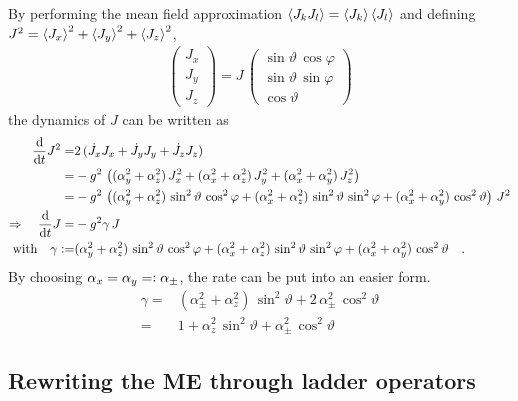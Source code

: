 \documentclass{article}
\begin{document}
By performing the mean field approximation $\braket{J_kJ_l}=\braket{J_k}\braket{J_l}$ and defining $J^2=\braket{J_x}^2+\braket{J_y}^2+\braket{J_z}^2$,
\begin{align*}
    \left(
    \begin{array}{c}
        J_x\\J_y\\J_z
    \end{array}
    \right)=J\,\left(\begin{array}{c}
        \sin\vartheta\,\cos\varphi \\
        \sin\vartheta\,\sin\varphi\\
        \cos\vartheta
    \end{array}
    \right)
\end{align*}
the dynamics of $J$ can be written as
\begin{align*}
    \dt J^2=&2\,(\dot{J}_xJ_x+\dot{J}_yJ_y+\dot{J}_zJ_z)\\=&-g^2\,\left((\alpha_y^2+\alpha_z^2)\,J_x^2+(\alpha_x^2+\alpha_z^2)\,J_y^2+(\alpha_x^2+\alpha_y^2)\,J_z^2\right)\\%
    =&-g^2\,\left((\alpha_y^2+\alpha_z^2)\,\sin^2\vartheta\,\cos^2\varphi+(\alpha_x^2+\alpha_z^2)\,\sin^2\vartheta\,\sin^2\varphi+(\alpha_x^2+\alpha_y^2)\,\cos^2\vartheta\right)\,J^2\\
    \Rightarrow\quad\dt J =&-g^2\gamma\,J\\
    \text{with}\quad \gamma\vcentcolon=&(\alpha_y^2+\alpha_z^2)\,\sin^2\vartheta\,\cos^2\varphi+(\alpha_x^2+\alpha_z^2)\,\sin^2\vartheta\,\sin^2\varphi+(\alpha_x^2+\alpha_y^2)\,\cos^2\vartheta\quad.
\end{align*}
By choosing $\alpha_x=\alpha_y=\vcentcolon\alpha_\pm$, the rate can be put into an easier form.
\begin{align*}
    \gamma=&(\alpha_\pm^2+\alpha_z^2)\,\sin^2\vartheta+ 2\,\alpha_\pm^2\,\cos^2\vartheta\\
    =&1+ \alpha_z^2\,\sin^2\vartheta + \alpha_\pm^2\,\cos^2\vartheta
\end{align*}








\subsection*{Rewriting the ME through ladder operators}
\end{document}
